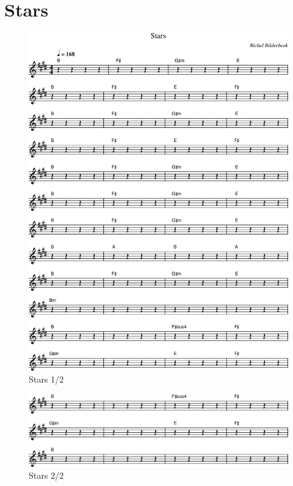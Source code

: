 \chapter{Stars}

%

\begin{figure}[!htbp]
  \includegraphics[width=\textwidth,height=\textheight,keepaspectratio]{../songs/xx_stars-0.png}
  \caption{Stars 1/2}
  \label{fig:xx_stars_1}
\end{figure}

\begin{figure}[!htbp]
  \includegraphics[width=\textwidth,height=\textheight,keepaspectratio]{../songs/xx_stars-1.png}
  \caption{Stars 2/2}
  \label{fig:xx_stars_2}
\end{figure}
